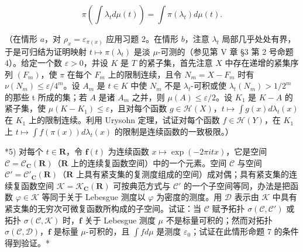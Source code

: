 \[
\pi \left(\int \lambda_ {t} d \mu (t)\right) = \int \pi (\lambda_ {t}) d \mu (t).
\]

（在情形 \(a\)，对 \(\rho_x = \varepsilon_{\pi(x)}\) 应用习题 2。在情形 \(b\)，注意 \(\lambda_t\) 局部几乎处处有界，于是可归结为证明映射 \(t \mapsto \pi(\lambda_t)\) 是淡 \(\mu\)-可测的（参见第 V 章 §3 第 2 号命题 4）。给定一个数 \(\varepsilon > 0\)，并设 \(K\) 是 \(T\) 的紧子集，首先注意 \(X\) 中存在递增的紧集序列 \((F_m)\)，使 \(\pi\) 在每个 \(F_m\) 上的限制连续，且令 \(N_m = X - F_m\) 时有 \(\nu(N_m) \leqslant \varepsilon/4^m\)。设 \(A_m\) 是 \(t \in K\) 中使 \(N_m\) 不是 \(\lambda_t\)-可积或使 \(\lambda_t(N_m) > 1/2^m\) 的那些 t 所成的集；若 \(A\) 是诸 \(A_m\) 之并，则 \(\mu(A) \leqslant \varepsilon/2\)。设 \(K_1\) 是 \(K - A\) 的紧子集，使 \(\mu(K - K_1) \leqslant \varepsilon\)，且对每个函数 \(g \in \mathcal{H}(X)\)，\(t \mapsto \int g(x) d\lambda_t(x)\) 在 \(K_1\) 上的限制连续。利用 Urysohn 定理，试证对每个函数 \(f \in \mathcal{H}(Y)\)，在 \(K_1\) 上 \(t \mapsto \int f(\pi(x)) d\lambda_t(x)\) 的限制是连续函数的一致极限。）

*5) 对每个 \(t \in \mathbf{R}\)，令 \(\mathbf{f}(t)\) 为连续函数 \(x \mapsto \exp(-2\pi itx)\)，它是空间 \(\mathcal{C} = \mathcal{C}_{\mathbf{C}}(\mathbf{R})\)（\(\mathbf{R}\) 上的连续复函数空间）中的一个元素。空间 \(\mathcal{C}\) 与空间 \(\mathcal{C}' = \mathcal{C}'_{\mathbf{C}}(\mathbf{R})\)（\(\mathbf{R}\) 上具有紧支集的复测度组成的空间）成对偶；具有紧支集的连续复函数空间 \(\mathcal{K} = \mathcal{K}_{\mathbf{C}}(\mathbf{R})\) 可按典范方式与 \(\mathcal{C}'\) 的一个子空间等同，办法是把函数 \(\varphi \in \mathcal{K}\) 等同于关于 Lebesgue 测度以 \(\varphi\) 为密度的测度。用 \(\mathcal{D}\) 表示由 \(\mathcal{K}\) 中具有紧支集的无穷次可微复函数所构成的子空间。试证：当 \(\mathcal{C}\) 赋予拓扑 \(\sigma(\mathcal{C},\mathcal{C}')\) 或拓扑 \(\sigma(\mathcal{C},\mathcal{K})\) 时，\(\mathbf{f}\) 关于 Lebesgue 测度 \(\mu\) 不是标量可积的；然而对拓扑 \(\sigma(\mathcal{C},\mathcal{D})\)，\(\mathbf{f}\) 是标量 \(\mu\)-可积的，且 \(\int f d\mu\) 是测度 \(\varepsilon_0\)；试证在此情形命题 7 的条件得到验证。*

